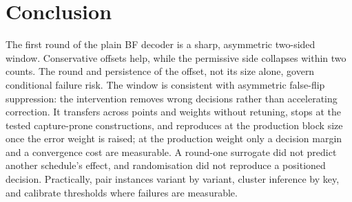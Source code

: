 \section{Conclusion}\label{sec:conclusion}

The first round of the plain BF decoder is a sharp, asymmetric two-sided window. Conservative offsets help, while the permissive side collapses within two counts. The round and persistence of the offset, not its size alone, govern conditional failure risk. The window is consistent with asymmetric false-flip suppression: the intervention removes wrong decisions rather than accelerating correction. It transfers across points and weights without retuning, stops at the tested capture-prone constructions, and reproduces at the production block size once the error weight is raised; at the production weight only a decision margin and a convergence cost are measurable. A round-one surrogate did not predict another schedule's effect, and randomisation did not reproduce a positioned decision. Practically, pair instances variant by variant, cluster inference by key, and calibrate thresholds where failures are measurable.
